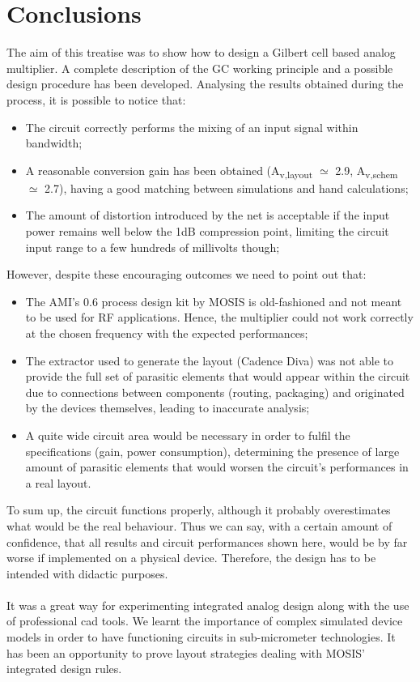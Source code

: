 \section{Conclusions}

The aim of this treatise was to show how to design a Gilbert cell based analog multiplier. A complete description of the GC working principle and a possible design procedure has been developed. Analysing the results obtained during the process, it is possible to notice that:
\begin{itemize}
	\item The circuit correctly performs the mixing of an input signal within bandwidth;
	\item A reasonable conversion gain has been obtained (A\textsubscript{v,layout} $\simeq$ 2.9, A\textsubscript{v,schem} $\simeq$ 2.7), having a good matching between simulations and hand calculations;
	\item The amount of distortion introduced by the net is acceptable if the input power remains well below the 1dB compression point, limiting the circuit input range to a few hundreds of millivolts though;
\end{itemize}
However, despite these encouraging outcomes we need to point out that:
\begin{itemize}
	\item The AMI's 0.6 process design kit by MOSIS is old-fashioned and not meant to be used for RF applications. Hence, the multiplier could not work correctly at the chosen frequency with the expected performances;
	\item The extractor used to generate the layout (Cadence Diva) was not able to provide the full set of parasitic elements that would appear within the circuit due to connections between components (routing, packaging) and originated by the devices themselves, leading to inaccurate analysis;
	\item A quite wide circuit area would be necessary in order to fulfil the specifications (gain, power consumption), determining the presence of large amount of parasitic elements that would worsen the circuit's performances in a real layout.  
\end{itemize}
To sum up, the circuit functions properly, although it probably overestimates what would be the real behaviour. Thus we can say, with a certain amount of confidence, that all results and circuit performances shown here, would be by far worse if implemented on a physical device.  Therefore, the design has to be intended with didactic purposes.
\\
\\
It was a great way for experimenting integrated analog design along with the use of professional cad tools. We learnt the importance of complex simulated device models in order to have functioning circuits in sub-micrometer technologies. It has been an opportunity to prove layout strategies dealing with MOSIS' integrated design rules.
